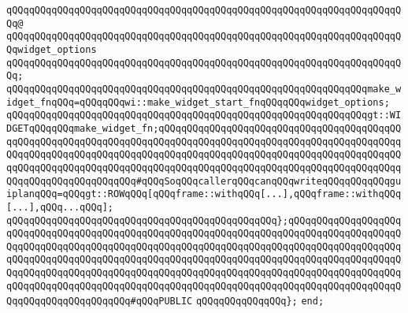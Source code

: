 \verb|qQQqqQQqqQQqqQQqqQQqqQQqqQQqqQQqqQQqqQQqqQQqqQQqqQQqqQQqqQQqqQQqqQQqqQQq@|\newline
\verb|qQQqqQQqqQQqqQQqqQQqqQQqqQQqqQQqqQQqqQQqqQQqqQQqqQQqqQQqqQQqqQQqqQQqqQQqwidget_options|\newline
\verb|qQQqqQQqqQQqqQQqqQQqqQQqqQQqqQQqqQQqqQQqqQQqqQQqqQQqqQQqqQQqqQQqqQQqqQQq;|\newline
\newline
\verb|qQQqqQQqqQQqqQQqqQQqqQQqqQQqqQQqqQQqqQQqqQQqqQQqqQQqqQQqqQQqqQQqmake_widget_fnqQQq=qQQqqQQqwi::make_widget_start_fnqQQqqQQqwidget_options;|\newline
\newline
\verb|qQQqqQQqqQQqqQQqqQQqqQQqqQQqqQQqqQQqqQQqqQQqqQQqqQQqqQQqqQQqqQQqgt::WIDGETqQQqqQQqmake_widget_fn;qQQqqQQqqQQqqQQqqQQqqQQqqQQqqQQqqQQqqQQqqQQqqQQqqQQqqQQqqQQqqQQqqQQqqQQqqQQqqQQqqQQqqQQqqQQqqQQqqQQqqQQqqQQqqQQqqQQqqQQqqQQqqQQqqQQqqQQqqQQqqQQqqQQqqQQqqQQqqQQqqQQqqQQqqQQqqQQqqQQqqQQqqQQqqQQqqQQqqQQqqQQqqQQqqQQqqQQqqQQqqQQqqQQqqQQqqQQqqQQqqQQqqQQqqQQqqQQqqQQqqQQqqQQqqQQqqQQq#qQQqSoqQQqcallerqQQqcanqQQqwriteqQQqqQQqqQQqguiplanqQQq=qQQqgt::ROWqQQq[qQQqframe::withqQQq[...],qQQqframe::withqQQq[...],qQQq...qQQq];|\newline
\verb|qQQqqQQqqQQqqQQqqQQqqQQqqQQqqQQqqQQqqQQqqQQqqQQq};qQQqqQQqqQQqqQQqqQQqqQQqqQQqqQQqqQQqqQQqqQQqqQQqqQQqqQQqqQQqqQQqqQQqqQQqqQQqqQQqqQQqqQQqqQQqqQQqqQQqqQQqqQQqqQQqqQQqqQQqqQQqqQQqqQQqqQQqqQQqqQQqqQQqqQQqqQQqqQQqqQQqqQQqqQQqqQQqqQQqqQQqqQQqqQQqqQQqqQQqqQQqqQQqqQQqqQQqqQQqqQQqqQQqqQQqqQQqqQQqqQQqqQQqqQQqqQQqqQQqqQQqqQQqqQQqqQQqqQQqqQQqqQQqqQQqqQQqqQQqqQQqqQQqqQQqqQQqqQQqqQQqqQQqqQQqqQQqqQQqqQQqqQQqqQQqqQQqqQQqqQQqqQQqqQQqqQQqqQQqqQQqqQQqqQQq#qQQqPUBLIC|\newline
\verb|qQQqqQQqqQQqqQQq};|\newline
\verb|end;|\newline
\newline
\newline
\newline

